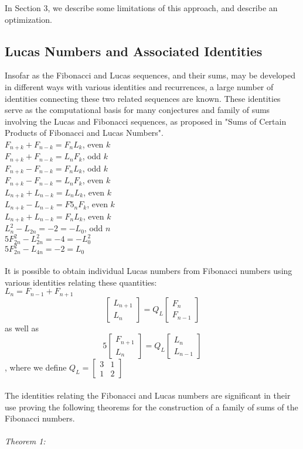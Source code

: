 \documentclass[11pt]{article}
\begin{document}
In Section 3, we describe some limitations of this approach, and describe an optimization.

\subsection{Lucas Numbers and Associated Identities}
Insofar as the Fibonacci and Lucas sequences, and their sums, may be developed in different ways with various identities and recurrences, a large number of identities connecting these two related sequences are known. These identities serve as the computational basis for many conjectures and family of sums involving the Lucas and Fibonacci sequences, as proposed in "Sums of Certain Products of Fibonacci and Lucas Numbers". \\
$F_{n+k} + F_{n-k} = F_{n}L_{k}$, even $k$\\
$F_{n+k} + F_{n-k} = L_{n}F_{k}$, odd $k$\\$F_{n+k} - F_{n-k} = F_{n}L_{k}$, odd $k$ \\ $F_{n+k} - F_{n-k} = L_{n}F_{k}$, even $k$ \\ $L_{n+k} + L_{n-k} = L_{n}L_{k}$, even $k$ \\ $L_{n+k} - L_{n-k}= F5_{n}F_{k}$, even $k$ \\ $L_{n+k} + L_{n-k} = F_{n}L_{k}$, even $k$\\ $L_{n}^{2} - L_{2n} = -2 = -L_{0}$, odd $n$\\ $5F_{2n}^{2} - L_{2n}^{2} = -4 = -L_{0}^{2}$\\ $5F_{2n}^{2} - L_{4n} = -2 = L_{0}$\\\\  It is possible to obtain individual Lucas numbers from Fibonacci numbers using various identities relating these quantities:\\$L_{n} = F_{n-1} + F_{n+1}$ \\ 
\[
\begin{bmatrix}
L_{n+1} \\
L_{n}
\end{bmatrix} = Q_{L} \begin{bmatrix} F_{n} \\ F_{n-1}\end{bmatrix}
\] 
as well as \\
\[
5\begin{bmatrix}
F_{n+1} \\
L_{n}
\end{bmatrix} = Q_{L} \begin{bmatrix} L_{n} \\ L_{n-1}\end{bmatrix}
\] , where we define $Q_{L} = \begin{bmatrix} 3 & 1 \\ 1 & 2 \end{bmatrix}$
\\
\\
The identities relating the Fibonacci and Lucas numbers are significant in their use proving the following theorems for the construction of a family of sums of the Fibonacci numbers.\\ \\
\textit{Theorem 1:}  
\end{document}
